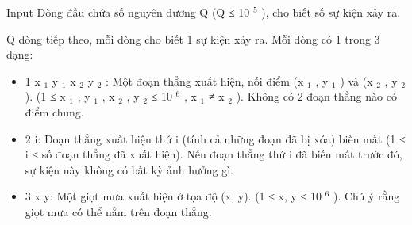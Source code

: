 Input
Dòng đầu chứa số nguyên dương Q (Q ≤ 10 $^ 5 $ ), cho biết số sự kiện xảy ra.

Q dòng tiếp theo, mỗi dòng cho biết 1 sự kiện xảy ra. Mỗi dòng có 1 trong 3 dạng:
\begin{itemize}
	\item 1 x $_ 1 $ y $_ 1 $ x $_ 2 $ y $_ 2 $ : Một đoạn thẳng xuất hiện, nối điểm (x $_ 1 $ , y $_ 1 $ ) và (x $_ 2 $ , y $_ 2 $ ). (1 ≤ x $_ 1 $ , y $_ 1 $ , x $_ 2 $ , y $_ 2 $ ≤ 10 $^ 6 $ , x $_ 1 $ ≠ x $_ 2 $ ). Không có 2 đoạn thẳng nào có điểm chung.
	\item 2 i: Đoạn thẳng xuất hiện thứ i (tính cả những đoạn đã bị xóa) biến mất (1 ≤ i ≤ số đoạn thẳng đã xuất hiện). Nếu đoạn thẳng thứ i đã biến mất trước đó, sự kiện này không có bất kỳ ảnh hưởng gì.
	\item 3 x y: Một giọt mưa xuất hiện ở tọa độ (x, y). (1 ≤ x, y ≤ 10 $^ 6 $ ). Chú ý rằng giọt mưa có thể nằm trên đoạn thẳng.
\end{itemize}